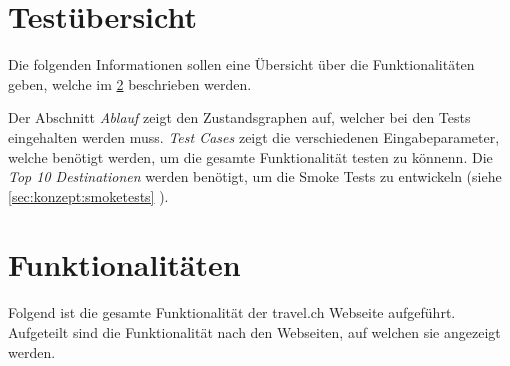 
\appendix
\chapter{Testübersicht}
\label{app:Testfälle}
Die folgenden Informationen sollen eine Übersicht über die Funktionalitäten geben, welche im  \cref{app:Funktionalitäten}  beschrieben werden.

Der Abschnitt \textit{Ablauf} zeigt den Zustandsgraphen auf, welcher bei den Tests eingehalten werden muss. \textit{Test Cases} zeigt die verschiedenen Eingabeparameter, welche benötigt werden, um die gesamte Funktionalität testen zu könnenn. Die \textit{Top 10 Destinationen} werden benötigt, um die Smoke Tests zu entwickeln (siehe \cref{sec:konzept:smoketests} ).







\chapter{Funktionalitäten}
\label{app:Funktionalitäten}
Folgend ist die gesamte Funktionalität der travel.ch Webseite aufgeführt. Aufgeteilt sind die Funktionalität nach den Webseiten, auf welchen sie angezeigt werden.

